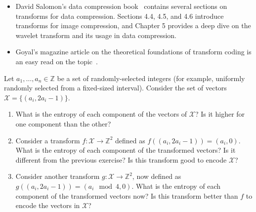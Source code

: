 \begin{itemize}
\item David Salomon's data compression book~\cite{salomon_compression_complete} contains several sections on transforms for data compression. Sections 4.4, 4.5, and 4.6 introduce transforms for image compression, and Chapter 5 provides a deep dive on the wavelet transform and its usage in data compression.
\vspace{0.1cm}
\item Goyal's magazine article on the theoretical foundations of transform coding is an easy read on the topic~\cite{goyal_transform_coding}.
\end{itemize}

\begin{exercise}
Let $a_1, \ldots, a_n\in\mathbb{Z}$ be a set of randomly-selected integers (for example, uniformly randomly selected from a fixed-sized interval). Consider the set of vectors $\mathcal{X}=\lbrace (a_i, 2a_i -1) \rbrace$.
\begin{enumerate}
\item What is the entropy of each component of the vectors of $\mathcal{X}$? Is it higher for one component than the other?
\item Consider a transform $f : \mathcal{X} \rightarrow \mathbb{Z}^2$ defined as $f((a_i, 2a_i -1)) = (a_i, 0)$. What is the entropy of each component of the transformed vectors? Is it different from the previous exercise? Is this transform good to encode $\mathcal{X}$?
\item Consider another transform $g : \mathcal{X} \rightarrow \mathbb{Z}^2$, now defined as $g((a_i, 2a_i -1)) = (a_i \mod 4, 0)$. What is the entropy of each component of the transformed vectors now? Is this transform better than $f$ to encode the vectors in $\mathcal{X}$?
\end{enumerate}
\end{exercise}

